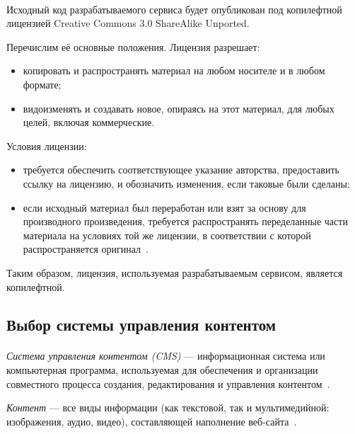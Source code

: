 \paragraph{}
Исходный код разрабатываемого сервиса будет опубликован под копилефтной лицензией 
Creative Commons 3.0 ShareAlike Unported.

Перечислим её основные положения. Лицензия разрешает:
\begin{itemize}
\item копировать и распространять материал на любом носителе и в любом формате;
\item видоизменять и создавать новое, опираясь на этот материал, для любых целей, включая коммерческие.
\end{itemize}

Условия лицензии:
\begin{itemize}
\item требуется обеспечить соответствующее указание авторства, предоставить ссылку на лицензию,
  и обозначить изменения, если таковые были сделаны;
\item если исходный материал был переработан или взят за основу для производного произведения,
  требуется распространять переделанные части материала на условиях той же лицензии, 
  в соответствии с которой распространяется оригинал~\cite{cc_by_sa}.
\end{itemize}

Таким образом, лицензия, используемая разрабатываемым сервисом, является копилефтной. 

\subsection{Выбор системы управления контентом}
\label{ssec:choice_cms}

\paragraph{}
\textit{Система управления контентом (CMS)} --- информационная система или компьютерная программа,
используемая для обеспечения и организации совместного процесса создания,
редактирования и управления контентом~\cite{wiki_cms}.

\textit{Контент} --- все виды информации (как текстовой, так и мультимедийной: изображения, аудио, видео),
составляющей наполнение веб-сайта~\cite{wiki_content}.

